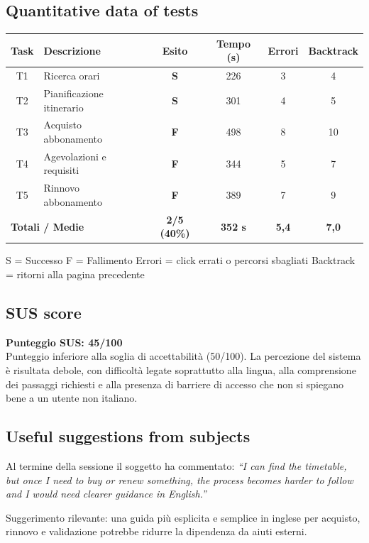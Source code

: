 \documentclass[11pt,a4paper]{article}
\begin{document}
\subsection*{Quantitative data of tests}
\begin{tcolorbox}[colback=backgroundColor,colframe=borderColor,arc=2mm]
\begin{center}
\renewcommand{\arraystretch}{1.4}
\begin{tabular}{clcccc}
\toprule
\textbf{Task} & \textbf{Descrizione} &
\textbf{Esito} & \textbf{Tempo (s)} &
\textbf{Errori} & \textbf{Backtrack} \\
\midrule
T1 & Ricerca orari             & \textbf{S} & 226 & 3 & 4 \\
T2 & Pianificazione itinerario & \textbf{S} & 301 & 4 & 5 \\
T3 & Acquisto abbonamento      & \textbf{F} & 498 & 8 & 10 \\
T4 & Agevolazioni e requisiti   & \textbf{F} & 344 & 5 & 7 \\
T5 & Rinnovo abbonamento       & \textbf{F} & 389 & 7 & 9 \\
\midrule
\multicolumn{2}{l}{\textbf{Totali / Medie}} &
\textbf{2/5 (40\%)} & \textbf{352 s} &
\textbf{5,4} & \textbf{7,0} \\
\bottomrule
\end{tabular}
\end{center}
\vspace{0.3cm}
\small S = Successo \quad F = Fallimento \quad
Errori = click errati o percorsi sbagliati \quad
Backtrack = ritorni alla pagina precedente
\end{tcolorbox}

\subsection*{SUS score}
\begin{tcolorbox}[colback=backgroundColor,colframe=borderColor,arc=2mm]
\textbf{Punteggio SUS: 45/100}\\[0.2cm]
\small Punteggio inferiore alla soglia di accettabilità (50/100). La percezione del sistema è risultata debole, con difficoltà legate soprattutto alla lingua, alla comprensione dei passaggi richiesti e alla presenza di barriere di accesso che non si spiegano bene a un utente non italiano.
\end{tcolorbox}

\subsection*{Useful suggestions from subjects}
\begin{tcolorbox}[colback=backgroundColor,colframe=borderColor,arc=2mm]
Al termine della sessione il soggetto ha commentato: \textit{``I can find the timetable, but once I need to buy or renew something, the process becomes harder to follow and I would need clearer guidance in English.''}

Suggerimento rilevante: una guida più esplicita e semplice in inglese per acquisto, rinnovo e validazione potrebbe ridurre la dipendenza da aiuti esterni.
\end{tcolorbox}
\end{document}
